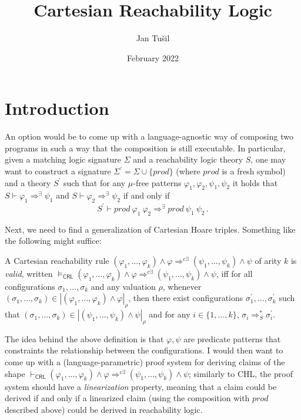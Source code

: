 \documentclass{article}
\title{Cartesian Reachability Logic}
\author{Jan Tušil }
\date{February 2022}
\newcommand{\CRL}{\mathsf{CRL}}
\begin{document}
\maketitle

\section{Introduction}

An option would be to come up with a language-agnostic way of composing two programs in such a way
that the composition is still executable.
In particular, given a matching logic signature $\Sigma$ and a reachability logic theory $S$, one may
want to construct a signature $\Sigma^\prime = \Sigma \cup \{ \mathit{prod} \}$
(where $\mathit{prod}$ is a fresh symbol)
and a theory $S^\prime$ such that for any $\mu$-free patterns $\varphi_1,\varphi_2,\psi_1,\psi_2$
it holds that $S \vdash \varphi_1 \Rightarrow^\exists \psi_1$ and
$S \vdash \varphi_2 \Rightarrow^\exists \psi_2$ if and only if
\begin{equation*}
S^\prime \vdash \mathit{prod}\ \varphi_1\ \varphi_2 \Rightarrow^\exists \mathit{prod}\ \psi_1\ \psi_2    \, .
\end{equation*}

Next, we need to find a generalization of Cartesian Hoare triples.
Something like the following might suffice:
\begin{definition}\label{def:CRLsemantics}
A Cartesian reachability rule
$(\varphi_1,\ldots,\varphi_k) \land \varphi \Rightarrow^{c\exists} (\psi_1,\ldots,\psi_k) \land \psi$
of arity $k$
is \emph{valid},
written
$\vDash_\CRL (\varphi_1,\ldots,\varphi_k) \land \varphi \Rightarrow^{c\exists}
(\psi_1,\ldots,\psi_k) \land \psi$,
iff for all configurations $\sigma_1,\ldots,\sigma_k$ and any valuation $\rho$,
whenever $(\sigma_1, \ldots, \sigma_k) \in |(\varphi_1, \ldots, \varphi_k) \land \varphi|_\rho$,
then there exist configurations $\sigma_1^\prime,\ldots,\sigma_k^\prime$ such that
$(\sigma_1,\ldots,\sigma_k) \in |(\psi_1,\ldots,\psi_k) \land \psi|_\rho$ and for any $i \in \{ 1,\ldots,k \}$,
$\sigma_i \Rightarrow^*_S \sigma_i^\prime$.
\end{definition}
The idea behind the above definition is that $\varphi,\psi$ are predicate patterns
that constraints the relationship between the configurations.
I would then want to come up with a (language-parametric) proof system
for deriving claims of the shape
$\vdash_\CRL (\varphi_1,\ldots,\varphi_k) \land \varphi \Rightarrow^{c\exists}
(\psi_1,\ldots,\psi_k) \land \psi$;
similarly to CHL, the proof system should have a \emph{linearization} property,
meaning that a claim could be derived if and only if
a linearized claim (using the composition with $\textit{prod}$ described above) could be derived in reachability logic.
\end{document}
